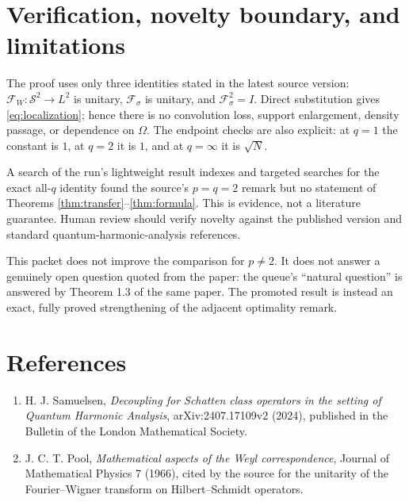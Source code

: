\documentclass[11pt]{article}
\newcommand{\Fc}{\mathcal F_{\sigma}}
\newcommand{\Fw}{\mathcal F_W}
\newcommand{\Sp}{\mathcal S}
\begin{document}
\section{Verification, novelty boundary, and limitations}

The proof uses only three identities stated in the latest source version:
$\Fw:\Sp^2\to L^2$ is unitary, $\Fc$ is unitary, and $\Fc^2=I$.  Direct
substitution gives \eqref{eq:localization}; hence there is no convolution
loss, support enlargement, density passage, or dependence on $\Omega$.
The endpoint checks are also explicit: at $q=1$ the constant is $1$, at
$q=2$ it is $1$, and at $q=\infty$ it is $\sqrt N$.

A search of the run's lightweight result indexes and targeted searches for
the exact all-$q$ identity found the source's $p=q=2$ remark but no statement
of Theorems \ref{thm:transfer}--\ref{thm:formula}.  This is evidence, not a
literature guarantee.  Human review should verify novelty against the
published version and standard quantum-harmonic-analysis references.

This packet does not improve the comparison for $p\ne2$.  It does not answer
a genuinely open question quoted from the paper: the queue's ``natural
question'' is answered by Theorem 1.3 of the same paper.  The promoted result
is instead an exact, fully proved strengthening of the adjacent optimality
remark.

\section*{References}

\begin{enumerate}
\item H. J. Samuelsen, \emph{Decoupling for Schatten class operators in the
setting of Quantum Harmonic Analysis}, arXiv:2407.17109v2 (2024), published
in the Bulletin of the London Mathematical Society.
\item J. C. T. Pool, \emph{Mathematical aspects of the Weyl correspondence},
Journal of Mathematical Physics 7 (1966), cited by the source for the
unitarity of the Fourier--Wigner transform on Hilbert--Schmidt operators.
\end{enumerate}
\end{document}

